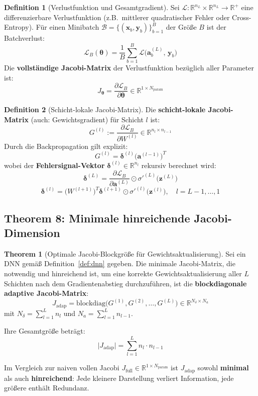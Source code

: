 ﻿\documentclass[a4paper,12pt]{article}
\theoremstyle{definition}
\newtheorem{definition}{Definition}
\newtheorem{theorem}{Theorem}
\begin{document}
\begin{definition}[Verlustfunktion und Gesamtgradient]
	\label{def:loss}
	Sei $\mathcal{L}: \mathbb{R}^{n_L} \times \mathbb{R}^{n_L} \to \mathbb{R}^+$ eine differenzierbare Verlustfunktion (z.B.\ mittlerer quadratischer Fehler oder Cross-Entropy). Für einen Minibatch $\mathcal{B} = \{(\boldsymbol{x}_b, \boldsymbol{y}_b)\}_{b=1}^B$ der Größe $B$ ist der Batchverlust:
	\[
	\mathcal{L}_B(\boldsymbol{\theta}) = \frac{1}{B} \sum_{b=1}^B \mathcal{L}\bigl(\boldsymbol{a}^{(L)}_b,\, \boldsymbol{y}_b\bigr)
	\]
	Die \textbf{vollständige Jacobi-Matrix} der Verlustfunktion bezüglich aller Parameter ist:
	\[
	J_{\boldsymbol{\theta}} = \frac{\partial \mathcal{L}_B}{\partial \boldsymbol{\theta}} \in \mathbb{R}^{1 \times N_{\mathrm{param}}}
	\]
\end{definition}

\begin{definition}[Schicht-lokale Jacobi-Matrix]
	\label{def:local_jacobi}
	Die \textbf{schicht-lokale Jacobi-Matrix} (auch: Gewichtsgradient) für Schicht $l$ ist:
	\[
	G^{(l)} := \frac{\partial \mathcal{L}_B}{\partial W^{(l)}} \in \mathbb{R}^{n_l \times n_{l-1}}
	\]
	Durch die Backpropagation gilt explizit:
	\[
	G^{(l)} = \boldsymbol{\delta}^{(l)} \bigl(\boldsymbol{a}^{(l-1)}\bigr)^T
	\]
	wobei der \textbf{Fehlersignal-Vektor} $\boldsymbol{\delta}^{(l)} \in \mathbb{R}^{n_l}$ rekursiv berechnet wird:
	\[
	\boldsymbol{\delta}^{(L)} = \frac{\partial \mathcal{L}_B}{\partial \boldsymbol{a}^{(L)}} \odot \sigma'^{(L)}\bigl(\boldsymbol{z}^{(L)}\bigr)
	\]
	\[
	\boldsymbol{\delta}^{(l)} = \bigl(W^{(l+1)}\bigr)^T \boldsymbol{\delta}^{(l+1)} \odot \sigma'^{(l)}\bigl(\boldsymbol{z}^{(l)}\bigr), \quad l = L-1, \ldots, 1
	\]
\end{definition}

\subsection{Theorem 8: Minimale hinreichende Jacobi-Dimension}

\begin{theorem}[Optimale Jacobi-Blockgröße für Gewichtsaktualisierung]
	\label{thm:optimal_size}
	Sei ein DNN gemäß Definition~\ref{def:dnn} gegeben. Die minimale Jacobi-Matrix, die notwendig und hinreichend ist, um eine korrekte Gewichtsaktualisierung aller $L$ Schichten nach dem Gradientenabstieg durchzuführen, ist die \textbf{blockdiagonale adaptive Jacobi-Matrix}:
	\[
	J_{\mathrm{adap}} = \mathrm{blockdiag}\bigl(G^{(1)}, G^{(2)}, \ldots, G^{(L)}\bigr) \in \mathbb{R}^{N_{\delta} \times N_a}
	\]
	mit $N_{\delta} = \sum_{l=1}^L n_l$ und $N_a = \sum_{l=1}^L n_{l-1}$.

	Ihre Gesamtgröße beträgt:
	\[
	\bigl|J_{\mathrm{adap}}\bigr| = \sum_{l=1}^L n_l \cdot n_{l-1}
	\]
	
	Im Vergleich zur naiven vollen Jacobi $J_{\mathrm{full}} \in \mathbb{R}^{1 \times N_{\mathrm{param}}}$ ist $J_{\mathrm{adap}}$ sowohl \textbf{minimal} als auch \textbf{hinreichend}: Jede kleinere Darstellung verliert Information, jede größere enthält Redundanz.
\end{theorem}
\end{document}
